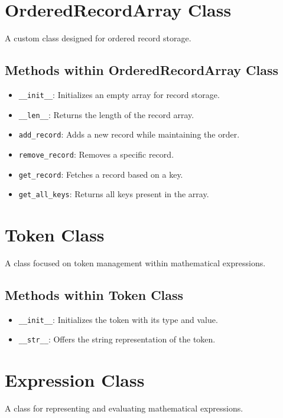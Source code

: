 \documentclass[12pt]{article}
\begin{document}
\section{OrderedRecordArray Class}
A custom class designed for ordered record storage.

\subsection{Methods within OrderedRecordArray Class}
\begin{itemize}
    \item \texttt{\_\_init\_\_}: Initializes an empty array for record storage.
    \item \texttt{\_\_len\_\_}: Returns the length of the record array.
    \item \texttt{add\_record}: Adds a new record while maintaining the order.
    \item \texttt{remove\_record}: Removes a specific record.
    \item \texttt{get\_record}: Fetches a record based on a key.
    \item \texttt{get\_all\_keys}: Returns all keys present in the array.
\end{itemize}

\section{Token Class}
A class focused on token management within mathematical expressions.

\subsection{Methods within Token Class}
\begin{itemize}
    \item \texttt{\_\_init\_\_}: Initializes the token with its type and value.
    \item \texttt{\_\_str\_\_}: Offers the string representation of the token.
\end{itemize}

\section{Expression Class}
A class for representing and evaluating mathematical expressions.
\end{document}
